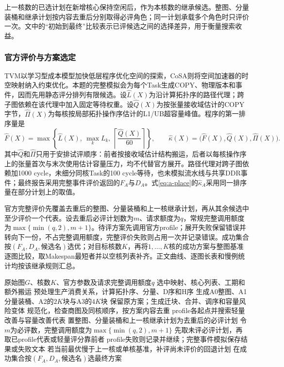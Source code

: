 上一核数的已选计划在新增核心保持空闲后，作为本核数的继承候选。整图、分量装桶和继承计划按内容去重后分别取得必评角色；同一计划承载多个角色时只评价一次。文中的“初始到最终”比较表示已评候选之间的选择差异，用于衡量搜索收益。

\subsubsection{官方评价与方案选定}
TVM以学习型成本模型加快低层程序优化空间的探索\cite{chen2018tvm}，CoSA则将空间加速器的时空映射纳入约束优化\cite{huang2021cosa}。本题的完整模拟会为每个Task生成COPY、物理版本和事件，因而先用静态评分排列有限候选。设$\widehat L(X)$为沿计算拓扑序的路径代理；跨子图依赖在该代理中加入固定等待权重。设$\widehat Q(X)$为按张量接收域估计的COPY字节，$\widehat\Pi(X)$为每核按局部拓扑操作序估计的L1/UB超容量峰值。程序的第一排序量是
\begin{equation}
\widehat F(X)=\max\left\{\widehat L(X),\ \max_k L_k,\
\left\lceil\frac{\widehat Q(X)}{60}\right\rceil\right\},\qquad
\widehat\kappa(X)=\bigl(\widehat F(X),\widehat Q(X),\widehat\Pi(X)\bigr).
\label{eq:a-light-score}
\end{equation}
其中$\widehat Q$和$\widehat\Pi$只用于安排试评顺序：前者按接收域估计结构搬运，后者以每核操作序上的张量首次与末次使用估计容量压力，均不代替官方展开。路径代理对跨子图依赖加1000 cycle，未细分同核Task的100 cycle等待，也未模拟流水线与共享DDR事件；最终报告采用完整事件评价返回的$F_A$与$D_A$。式\eqref{eq:a-place}的$\widehat\kappa_A$采用同一排序量在部分计划上的取值。

官方完整评价先覆盖去重后的整图、分量装桶和上一核继承计划，再从其余候选中至少评价一个代表。设去重后必评计划数为$m$、请求额度为$q$，常规完整调用额度为$\max\{\min(q,2),m+1\}$。待评方案先调用官方profile；展开失败保留错误并转向下一份，不占完整调用额度，完整评价失败则占用一次并记录错误。成功集合按$(F_A,D_A,\text{候选名})$选优；对目标核数$K$，再将$1,\ldots,K$核的成功方案与整图基准逐图比较，取Makespan最短者并以空核列表补齐。正文曲线、逐图长表和慢例统计均按该继承规则汇总。

\begin{algorithm}[H]\caption{问题一有限候选生成与官方评价}
\begin{algorithmic}[1]
\REQUIRE 原始图$G$、核数$K$、官方参数及请求完整调用额度$q$
\ENSURE 选中映射、核心列表、工期和额外搬运
\STATE 预处理生产消费关系，计算拓扑序、分量、D序和H序
\STATE 生成A0整图、A1分量装桶、A2的$2K$块与A3的$4K$块
\STATE 保留原方案；生成迁块、合并、调序和容量风险变体
\STATE 规范化，检查商图及同核顺序，按方案内容去重
\ENDFOR
\STATE profile各起点并搜索轻量改善与容量改善代表
\STATE 置整图、分量装桶和上一核继承计划为去重后的必评计划
\STATE 令$m$为必评数，完整调用额度为$\max\{\min(q,2),m+1\}$
\STATE 先取未评必评计划，再取已profile代表或轻量评分靠前者
\STATE profile失败则记录并继续；完整事件模拟保存结果或失败文本
\ENDWHILE
\STATE 若当前最优慢于上一核或单核基准，补评尚未评价的回退计划
\STATE 在成功集合按$(F_A,D_A,\text{候选名})$选最终方案
\end{algorithmic}\end{algorithm}

